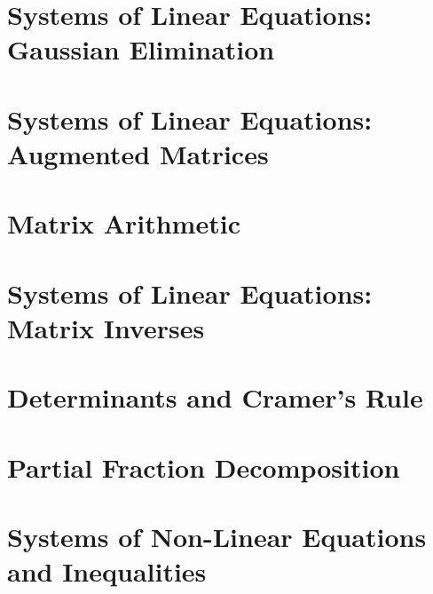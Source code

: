 \section{Systems of Linear Equations: Gaussian Elimination}



\newpage

\section{Systems of Linear Equations: Augmented Matrices}



\newpage

\section{Matrix Arithmetic}



\newpage

\section{Systems of Linear Equations: Matrix Inverses}



\newpage

\section{Determinants and Cramer's Rule}



\newpage

\section{Partial Fraction Decomposition}



\newpage


\section{Systems of Non-Linear Equations and Inequalities}



\newpage